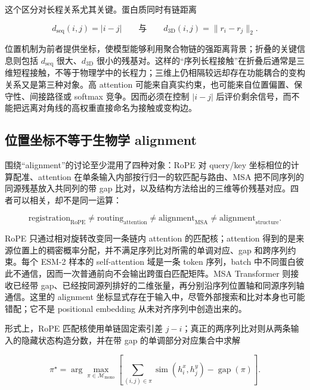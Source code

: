 \documentclass[10pt]{article}
\begin{document}
这个区分对长程关系尤其关键。蛋白质同时有链距离

\begin{equation}
d_{\mathrm{seq}}(i,j)=|i-j|
\qquad\text{与}\qquad
d_{\mathrm{3D}}(i,j)=\|r_i-r_j\|_2.
\label{eq:two_distances}
\end{equation}

位置机制为前者提供坐标，使模型能够利用聚合物链的强距离背景；折叠的关键信息则包括 $d_{\mathrm{seq}}$ 很大、$d_{\mathrm{3D}}$ 很小的残基对。这样的“序列长程接触”在折叠后通常是三维短程接触，不等于物理学中的长程力；三维上仍相隔较远却存在功能耦合的变构关系又是第三种对象。高 attention 可能来自真实约束，也可能来自位置偏置、保守性、间接路径或 softmax 竞争。因而必须在控制 $|i-j|$ 后评价剩余信号，而不能把远离对角线的高权重直接命名为接触或变构边。

\subsection*{位置坐标不等于生物学 alignment}

围绕“alignment”的讨论至少混用了四种对象：RoPE 对 query/key 坐标相位的计算配准、attention 在单条输入内部按行归一的软匹配与路由、MSA 把不同序列的同源残基放入共同列的带 gap 比对，以及结构方法给出的三维等价残基对应。四者可以相关，却不是同一运算：

\begin{equation}
\mathrm{registration}_{\mathrm{RoPE}}
\neq
\mathrm{routing}_{\mathrm{attention}}
\neq
\mathrm{alignment}_{\mathrm{MSA}}
\neq
\mathrm{alignment}_{\mathrm{structure}}.
\label{eq:alignment_distinction}
\end{equation}

RoPE 只通过相对旋转改变同一条链内 attention 的匹配核；attention 得到的是来源位置上的稠密概率分配，并不满足序列比对所需的单调对应、gap 和跨序列约束。每个 ESM-2 样本的 self-attention 域是一条 token 序列，batch 中不同蛋白彼此不通信，因而一次普通前向不会输出跨蛋白匹配矩阵。MSA Transformer 则接收已经带 gap、已经按同源列排好的二维张量，再分别沿序列位置轴和同源序列轴通信\cite{rao2021}。这里的 alignment 坐标显式存在于输入中，尽管外部搜索和比对本身也可能错配；它不是 positional embedding 从未对齐序列中创造出来的。

形式上，RoPE 匹配核使用单链固定索引差 $j-i$；真正的两序列比对则从两条输入的隐藏状态构造分数，并在带 gap 的单调部分对应集合中求解

\begin{equation}
\pi^\star
=\arg\max_{\pi\in\mathcal M_{\mathrm{mono}}}
\left[
\sum_{(i,j)\in\pi}\operatorname{sim}(h_i^x,h_j^y)
-\operatorname{gap}(\pi)
\right].
\label{eq:embedding_alignment}
\end{equation}
\end{document}
